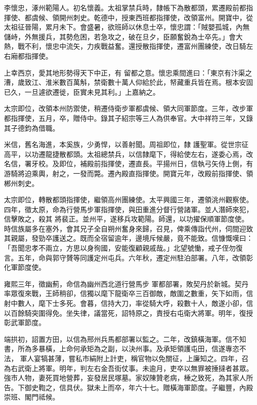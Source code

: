 \begin{pinyinscope}
 李懷忠，涿州範陽人。初名懷義。太祖掌禁兵時，隸帳下為散都頭，累遷殿前都指揮使、都虞候、領開州刺史。乾德中，授東西班都指揮使，改領富州。開寶中，從太祖征晉陽，累月未下。會盛暑，欲班師以休息士卒，懷忠謂：「賊嬰孤城，內無儲峙，外無援兵，其勢危困，若急攻之，破在旦夕，臣願奮銳為士卒先。」會大熱，戰不利，懷忠中流矢，力疾戰益奮。還授散指揮使，遷富州團練使，改日騎左右廂都指揮使。



 上幸西京，愛其地形勢得天下中正，有
 留都之意。懷忠乘間進曰：「東京有汴渠之漕，歲致江、淮米數百萬斛，禁衛數十萬人仰給於此，帑藏重兵皆在焉。根本安固已久，一旦遽欲遷徙，臣實未見其利。」上嘉納之。



 太宗即位，改領本州防禦使，稍遷侍衛步軍都虞候、領大同軍節度。三年，改步軍都指揮使，五月，卒，贈侍中。錄其子紹宗等三人為供奉官。大中祥符三年，又錄其子德鈞為借職。



 米信，舊名海進，本奚族，少勇悍，以善射聞。周祖即位，隸
 護聖軍。從世宗征高平，以功遷龍捷散都頭。太祖總禁兵，以信隸麾下，得給使左右，遂委心焉，改名信，署牙校。及即位，補殿前指揮使，遷直長。平揚州日，信執弓矢侍上側，有游騎將迫乘輿，射之，一發而斃。遷內殿直指揮使。開寶元年，改殿前指揮使、領郴州刺史。



 太宗即位，轉散都頭指揮使，繼領高州團練使。太平興國三年，遷領洮州觀察使。四年，徵太原，命為行營馬步軍指揮使，與田重進分督行營諸軍。並人潛師來犯，信擊敗之，殺其
 將裴正。並州平，遂移兵攻範陽。師還，以功擢保順軍節度使。時信族屬多在塞外，會其兄子全自朔州奮身來歸，召見，俾乘傳詣代州，伺間迎致其親屬，發勁卒護送之。既而全宿留逾年，邊境斥候嚴，竟不能致。信慷慨嘆曰：「吾聞忠孝不兩立，方思以身徇國，安能復顧親戚哉。」北望號慟，戒子侄勿復言。五年，命與郭守贇等同護定州屯兵。六年秋，遷定州駐泊部署。八年，改領彰化軍節度使。



 雍熙三年，徵幽薊，命信為幽州西北道行營馬步
 軍都部署，敗契丹於新城。契丹率眾復來戰，王師稍卻，信獨以麾下龍衛卒三百御敵，敵圍之數重，矢下如雨，信射中數人，麾下士多死。會暮，信持大刀，率從騎大呼，殺數十人，敵遂小卻，信以百餘騎突圍得免。坐失律，議當死，詔特原之，責授右屯衛大將軍。明年，復授彰武軍節度。



 端拱初，詔置方田，以信為邢州兵馬都部署以監之。二年，改鎮橫海軍。信不知書，所為多暴橫，上命何承矩為之副，以決州事。及承矩領護屯田，信遂專恣不法，
 軍人宴犒甚薄，嘗私市絹附上計吏，稱官物以免關征，上廉知之。四年，召為右武衛上將軍。明年，判左右金吾街仗事。未逾月，吏卒以無罪被捶撻者甚眾。強市人物，妻死買地營葬，妄發居民塚墓。家奴陳贊老病，棰之致死，為其家人所告。下御史鞫之，信具伏。獄未上而卒，年六十七。贈橫海軍節度。子繼豐，內殿崇班、閣門祗候。




\end{pinyinscope}
